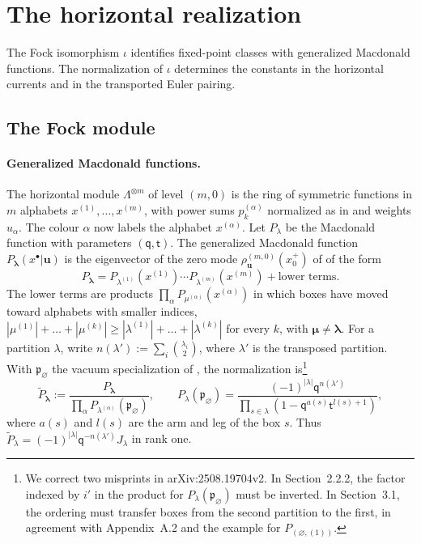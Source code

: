 \documentclass[11pt]{amsart}
\theoremstyle{definition}
\theoremstyle{remark}
\newcommand{\Mq}{\mathsf q}                      %
\newcommand{\Mt}{\mathsf t}                      %
\newcommand{\La}{\Lambda}                        %
\newcommand{\bl}{{\boldsymbol{\lambda}}}         %
\newcommand{\bmu}{{\boldsymbol{\mu}}}
\newcommand{\xplus}[1]{x^+_{#1}}                 %
\newcommand{\bu}{{\mathbf u}}                    %
\newcommand{\pk}[2]{p_{#1}^{(#2)}}               %
\newcommand{\GMP}[1]{P_{#1}}                     %
\newcommand{\GMPn}[1]{\widetilde P_{#1}}         %
\newcommand{\pvac}{\mathfrak p_\varnothing}      %
\newcommand{\Hiso}{\iota}                        %
\begin{document}
\section{The horizontal realization}\label{sec:horizontal}

The Fock isomorphism \(\Hiso\) identifies fixed-point classes with generalized
Macdonald functions. The normalization of \(\Hiso\) determines the constants in the
horizontal currents and in the transported Euler pairing.

\subsection{The Fock module}\label{sec:bcs}

\paragraph{Generalized Macdonald functions.}
The horizontal module \(\La^{\otimes m}\) of level \((m,0)\) is the ring of
symmetric functions in \(m\) alphabets \(x^{(1)},\dots,x^{(m)}\), with power sums
\(\pk{k}{\alpha}\) normalized as in \cite[Section~2.2.2]{BCS} and weights
\(u_\alpha\). The colour \(\alpha\) now labels the alphabet \(x^{(\alpha)}\).
Let \(\GMP{\lambda}\) be the Macdonald function
with parameters \((\Mq,\Mt)\). The generalized Macdonald function
\(\GMP{\bl}(x^\bullet|\bu)\) is the eigenvector of the zero mode
\(\rho^{(m,0)}_{\bu}(\xplus{0})\) of \cite{BCS} of the form
\[
 \GMP{\bl}=\GMP{\lambda^{(1)}}(x^{(1)})\cdots\GMP{\lambda^{(m)}}(x^{(m)})
 +\text{lower terms}.
\]
The lower terms are products \(\prod_\alpha\GMP{\mu^{(\alpha)}}(x^{(\alpha)})\)
in which boxes have moved toward alphabets with smaller indices,
\(|\mu^{(1)}|+\dots+|\mu^{(k)}|\geq|\lambda^{(1)}|+\dots+|\lambda^{(k)}|\) for every
\(k\), with \(\bmu\neq\bl\). For a partition \(\lambda\), write
\(n(\lambda'):=\sum_i\binom{\lambda_i}{2}\), where \(\lambda'\) is the transposed
partition. With \(\pvac\) the vacuum specialization of \cite{BCS}, the
normalization is\footnote{We correct two misprints in
arXiv:2508.19704v2. In Section~2.2.2, the factor indexed by \(i'\) in the
product for \(\GMP{\lambda}(\pvac)\) must be inverted. In Section~3.1, the
ordering must transfer boxes from the second partition to the first, in agreement
with Appendix~A.2 and the example for \(\GMP{(\varnothing,(1))}\).}
\[
 \GMPn{\bl}:=\frac{\GMP{\bl}}{\prod_\alpha\GMP{\lambda^{(\alpha)}}(\pvac)},
 \qquad
 \GMP{\lambda}(\pvac)=\frac{(-1)^{|\lambda|}\Mq^{n(\lambda')}}
   {\prod_{s\in\lambda}(1-\Mq^{a(s)}\Mt^{l(s)+1})},
\]
where \(a(s)\) and \(l(s)\) are the arm and leg of the box \(s\). Thus
\(\GMPn{\lambda}=(-1)^{|\lambda|}\Mq^{-n(\lambda')}J_\lambda\) in rank one.
\end{document}
